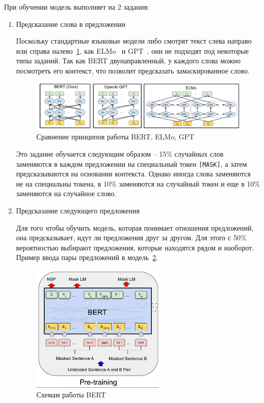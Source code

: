 \documentclass[PI, VKR]{HSEUniversity}
\begin{document}
При обучении модель выполняет на 2 задания:
\begin{enumerate}
\item Предсказание слова в предложении

Поскольку стандартные языковые модели либо смотрят текст слева направо или справа налево~\ref{fig:BERT_comparisons}, как ELMo~\autocite{peters_deep_2018} и GPT~\autocite{radford_language_2019}, они не подходят под некоторые типы заданий. Так как BERT двунаправленный, у каждого слова можно посмотреть его контекст, что позволит предсказать замаскированное слово.

\begin{figure}[h]
\centering
\includegraphics[width=.9\linewidth]{img/BERT_comparisons.pdf}
\caption{\label{fig:BERT_comparisons}Сравнение принципов работы BERT, ELMo, GPT}
\end{figure}

Это задание обучается следующим образом -- 15\% случайных слов заменяются в каждом предложении на специальный токен \texttt{[MASK]}, а затем предсказываются на основании контекста. Однако иногда слова заменяются не на специальны токена, в 10\% заменяются на случайный токен и еще в 10\% заменяются на случайное слово.

\item Предсказание следующего предложения

Для того чтобы обучить модель, которая понимает отношения предложений, она предсказывает, идут ли предложения друг за другом. Для этого с 50\% вероятностью выбирают предложения, которые находятся рядом и наоборот. Пример ввода пары предложений в модель~\ref{fig:bert_pretrainin}.

\begin{figure}[hbp]
\centering
\includegraphics[width=0.6\textwidth]{img/bert_pretrainin.png}
\caption{\label{fig:bert_pretrainin}Схемам работы BERT}
\end{figure}
\end{enumerate}
\end{document}
